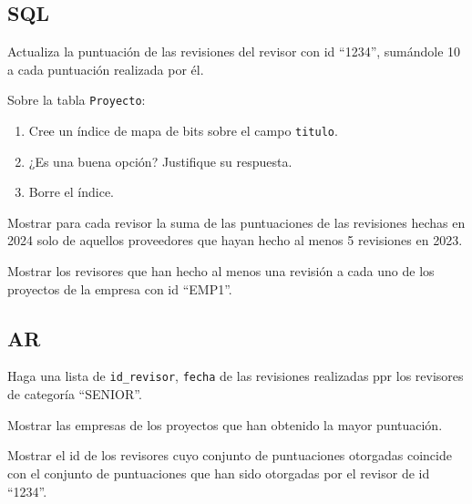 \documentclass[12pt]{article}
\begin{document}
    \subsection*{SQL}
    \begin{ejercicio}
        Actualiza la puntuación de las revisiones del revisor con id ``1234'', sumándole 10 a cada puntuación realizada por él.
    \end{ejercicio}
    \begin{ejercicio}
        Sobre la tabla \verb|Proyecto|:
        \begin{enumerate}[label=\alph*)]
            \item Cree un índice de mapa de bits sobre el campo \verb|titulo|.
            \item ¿Es una buena opción? Justifique su respuesta.
            \item Borre el índice.
        \end{enumerate}
    \end{ejercicio}
    \begin{ejercicio}
        Mostrar para cada revisor la suma de las puntuaciones de las revisiones hechas en 2024 solo de aquellos proveedores que hayan hecho al menos 5 revisiones en 2023.
    \end{ejercicio}
    \begin{ejercicio}
        Mostrar los revisores que han hecho al menos una revisión a cada uno de los proyectos de la empresa con id ``EMP1''. 
    \end{ejercicio}
    \subsection*{AR}
    \begin{ejercicio}
        Haga una lista de \verb|id_revisor|, \verb|fecha| de las revisiones realizadas ppr los revisores de categoría ``SENIOR''.
    \end{ejercicio}
    \begin{ejercicio}
        Mostrar las empresas de los proyectos que han obtenido la mayor puntuación.
    \end{ejercicio}
    \begin{ejercicio}
        Mostrar el id de los revisores cuyo conjunto de puntuaciones otorgadas coincide con el conjunto de puntuaciones que han sido otorgadas por el revisor de id ``1234''.
    \end{ejercicio}

    \newpage
    \setcounter{ejercicio}{0}
\end{document}
